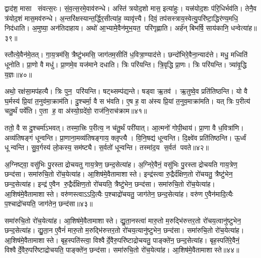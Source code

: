 द्वाद॑श॒ मासा संवत्स॒रः। 
सं॒व॒त्स॒रमे॒वाव॑रुन्धे। 
अस्ति॑ त्रयोद॒शो मास॒ इत्या॑हुः। 
यत्त्र॑योद॒शः प॑रि॒धिर्भव॑ति। 
तेनै॒व त्र॑योद॒शं मास॒मव॑रुन्धे। 
अ॒न्तरि॑क्षस्यान्त॒र्द्धिर॒सीत्या॑ह॒ व्यावृ॑त्त्यै। 
दिवं॒ तप॑सस्त्राय॒स्वेत्यु॒परि॑ष्टा॒द्धिर॑ण्य॒मधि॒ निद॑धाति। 
अ॒मुष्या॒ अन॑तिदाहाय। 
अथो॑ आ॒भ्यामे॒वैन॑मुभ॒यत॒ परि॑गृह्णाति। 
अर्\mbox{}ह॑न् बिभर्\mbox{}षि॒ साय॑कानि॒ धन्वेत्या॑ह॥३९॥

स्तौत्ये॒वैन॑मे॒तत्। 
गा॒य॒त्रम॑सि॒ त्रैष्टु॑भमसि॒ जाग॑तम॒सीति॑ ध॒वित्रा॒ण्याद॑त्ते। 
छन्दो॑भिरे॒वैना॒न्याद॑त्ते। 
मधु॒ मध्विति॑ धूनोति। 
प्रा॒णो वै मधु॑। 
प्रा॒णमे॒व यज॑माने दधाति। 
त्रिः परि॑यन्ति। 
त्रि॒वृद्धि प्रा॒णः। 
त्रिः परि॑यन्ति। 
त्र्या॑वृ॒द्धि य॒ज्ञः॥४०॥

अथो॒ रक्ष॑सा॒मप॑हत्यै। 
त्रिः पुन॒ परि॑यन्ति। 
षट्थ्सम्प॑द्यन्ते। 
षड्वा ऋ॒तव॑। 
ऋ॒तुष्वे॒व प्रति॑तिष्ठन्ति। 
यो वै घ॒र्मस्य॑ प्रि॒यां त॒नुव॑मा॒क्राम॑ति। 
दु॒श्चर्मा॒ वै स भ॑वति। 
ए॒ष ह॒ वा अ॑स्य प्रि॒यां त॒नुव॒माक्रा॑मति। 
यत् त्रिः प॒रीत्य॑ चतु॒र्थं पर्ये॑ति। 
ए॒ता ह॒ वा अ॑स्यो॒ग्रदे॑वो॒ राज॑नि॒राच॑क्राम॥४१॥

ततो॒ वै स दु॒श्चर्मा॑ऽभवत्। 
तस्मा॒त्त्रिः प॒रीत्य॒ न च॑तु॒र्थं परी॑यात्। 
आ॒त्मनो॑ गोपी॒थाय॑। 
प्रा॒णा वै ध॒वित्रा॑णि। 
अव्य॑तिषङ्गं धून्वन्ति। 
प्रा॒णाना॒मव्य॑तिषङ्गाय॒ क्लृप्त्यै। 
वि॒नि॒षद्य॑ धून्वन्ति। 
दि॒क्ष्वे॑व प्रति॑तिष्ठन्ति। 
ऊ॒र्ध्वं धून्वन्ति। 
सु॒व॒र्गस्य॑ लो॒कस्य॒ सम॑ष्ट्यै। 
स॒र्वतो॑ धून्वन्ति। 
तस्मा॑द॒य स॒र्वत॑ पवते॥४२॥
\anuvakamend[द॒धा॒ती॒वान्वा॑ह य॒ज्ञस्या॑है॒ष उ॒परि॑ष्टादाशीर॒न्यो व्यास्था॒पय॑न्ति र॒श्मयो॑ भवन्ति॒ धन्वेत्या॑ह य॒ज्ञश्च॑क्राम॒ सम॑ष्ट्यै॒ द्वे च॑]

अ॒ग्निष्ट्वा॒ वसु॑भिः पु॒रस्ताद्रोचयतु गाय॒त्रेण॒ छन्द॒सेत्या॑ह। 
अ॒ग्निरे॒वैनं॒ वसु॑भिः पु॒रस्ताद्रोचयति गाय॒त्रेण॒ छन्द॑सा। 
समा॑रुचि॒तो रो॑च॒येत्या॑ह। 
आ॒शिष॑मे॒वैतामाशास्ते। 
इन्द्र॑स्त्वा रु॒द्रैर्द॑क्षिण॒तो रो॑चयतु॒ त्रैष्टु॑भेन॒ छन्द॒सेत्या॑ह। 
इन्द्र॑ ए॒वैन रु॒द्रैर्द॑क्षिण॒तो रो॑चयति॒ त्रैष्टु॑भेन॒ छन्द॑सा। 
समा॑रुचि॒तो रो॑च॒येत्या॑ह। 
आ॒शिष॑मे॒वैतामाशास्ते। 
वरु॑णस्त्वाऽऽदि॒त्यैः प॒श्चाद्रो॑चयतु॒ जाग॑तेन॒ छन्द॒सेत्या॑ह। 
वरु॑ण ए॒वैन॑मादि॒त्यैः प॒श्चाद्रो॑चयति॒ जाग॑तेन॒ छन्द॑सा॥४३॥

समा॑रुचि॒तो रो॑च॒येत्या॑ह। 
आ॒शिष॑मे॒वैतामाशास्ते। 
द्यु॒ता॒नस्त्वा॑ मारु॒तो म॒रुद्भि॑रुत्तर॒तो रो॑चय॒त्वानु॑ष्टुभेन॒ छन्द॒सेत्या॑ह। 
द्यु॒ता॒न ए॒वैनं॑ मारु॒तो म॒रुद्भि॑रुत्तर॒तो रो॑चय॒त्यानु॑ष्टुभेन॒ छन्द॑सा। 
समा॑रुचि॒तो रो॑च॒येत्या॑ह। 
आ॒शिष॑\-मे॒वैतामाशास्ते। 
बृह॒स्पति॑स्त्वा॒ विश्वैर्दे॒वैरु॒परि॑ष्टा\-द्रोचयतु॒ पाङ्क्ते॑न॒ छन्द॒सेत्या॑ह। 
बृह॒स्पति॑रे॒वैनं॒  विश्वैर्दे॒वै\-रु॒परि॑ष्टाद्रोचयति॒ पाङ्क्ते॑न॒ छन्द॑सा। 
समा॑रुचि॒तो रो॑च॒येत्या॑ह। 
आ॒शिष॑मे॒वैतामाशास्ते॥४४॥


